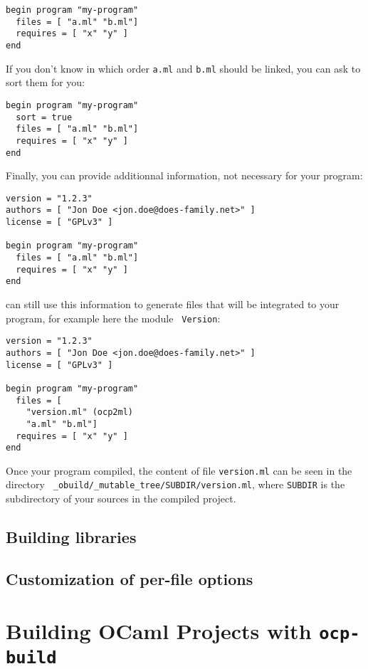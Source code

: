 \begin{verbatim}
begin program "my-program"
  files = [ "a.ml" "b.ml"]
  requires = [ "x" "y" ]
end
\end{verbatim}

If you don't know in which order {\tt a.ml} and {\tt b.ml} should be
linked, you can ask \ocpbuild{} to sort them for you:

\begin{verbatim}
begin program "my-program"
  sort = true
  files = [ "a.ml" "b.ml"]
  requires = [ "x" "y" ]
end
\end{verbatim}

Finally, you can provide additionnal information, not necessary for
your program:
\begin{verbatim}
version = "1.2.3"
authors = [ "Jon Doe <jon.doe@does-family.net>" ]
license = [ "GPLv3" ]

begin program "my-program"
  files = [ "a.ml" "b.ml"]
  requires = [ "x" "y" ]
end
\end{verbatim}

\ocpbuild{} can still use this information to generate files that will
be integrated to your program, for example here the module {\tt
  Version}:
\begin{verbatim}
version = "1.2.3"
authors = [ "Jon Doe <jon.doe@does-family.net>" ]
license = [ "GPLv3" ]

begin program "my-program"
  files = [ 
    "version.ml" (ocp2ml)
    "a.ml" "b.ml"]
  requires = [ "x" "y" ]
end
\end{verbatim}

Once your program compiled, the content of file {\tt version.ml} can
be seen in the directory {\tt
  \_obuild/\_mutable\_tree/SUBDIR/version.ml}, where {\tt SUBDIR} is
the subdirectory of your sources in the compiled project.

\section{Building libraries}

\section{Customization of per-file options}

\chapter{Building OCaml Projects with {\tt ocp-build}}

